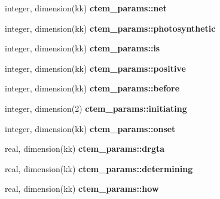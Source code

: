 \begin{DoxyCompactItemize}
\item 
\hypertarget{namespacectem__params_a914de05b84673206a021d1e7feb246bc}{}integer, dimension(kk) {\bfseries ctem\+\_\+params\+::net}\label{namespacectem__params_a914de05b84673206a021d1e7feb246bc}

\item 
\hypertarget{namespacectem__params_a7fc728d57bfd5d8e0006d262bbe8cae2}{}integer, dimension(kk) {\bfseries ctem\+\_\+params\+::photosynthetic}\label{namespacectem__params_a7fc728d57bfd5d8e0006d262bbe8cae2}

\item 
\hypertarget{namespacectem__params_a8da106b84ae9bfdbd87bbc11b77a80f4}{}integer, dimension(kk) {\bfseries ctem\+\_\+params\+::is}\label{namespacectem__params_a8da106b84ae9bfdbd87bbc11b77a80f4}

\item 
\hypertarget{namespacectem__params_aa553d8fa9e01eb5ed0ab26f60adeec8a}{}integer, dimension(kk) {\bfseries ctem\+\_\+params\+::positive}\label{namespacectem__params_aa553d8fa9e01eb5ed0ab26f60adeec8a}

\item 
\hypertarget{namespacectem__params_a05697863e3bf9d70703b282a4b220313}{}integer, dimension(kk) {\bfseries ctem\+\_\+params\+::before}\label{namespacectem__params_a05697863e3bf9d70703b282a4b220313}

\item 
\hypertarget{namespacectem__params_ac69f4a24eec09f7e95ad10795f5aed2b}{}integer, dimension(2) {\bfseries ctem\+\_\+params\+::initiating}\label{namespacectem__params_ac69f4a24eec09f7e95ad10795f5aed2b}

\item 
\hypertarget{namespacectem__params_a400a0e8820eae342e3c1c57ea801407a}{}integer, dimension(kk) {\bfseries ctem\+\_\+params\+::onset}\label{namespacectem__params_a400a0e8820eae342e3c1c57ea801407a}

\item 
\hypertarget{namespacectem__params_ad4b4b2e3174bff5d48329ff00f79da67}{}real, dimension(kk) {\bfseries ctem\+\_\+params\+::drgta}\label{namespacectem__params_ad4b4b2e3174bff5d48329ff00f79da67}

\item 
\hypertarget{namespacectem__params_ad9dba970434e6557993f0772342ba657}{}real, dimension(kk) {\bfseries ctem\+\_\+params\+::determining}\label{namespacectem__params_ad9dba970434e6557993f0772342ba657}

\item 
\hypertarget{namespacectem__params_ad870f8a6d5ac7c032e26602f1d89bd22}{}real, dimension(kk) {\bfseries ctem\+\_\+params\+::how}\label{namespacectem__params_ad870f8a6d5ac7c032e26602f1d89bd22}


\end{DoxyCompactItemize}

